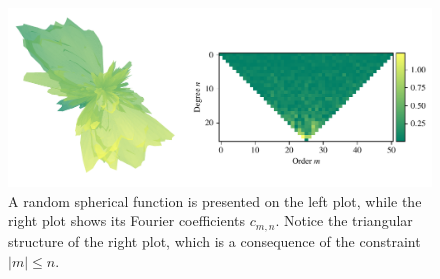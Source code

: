 \begin{figure}
  \centering
  \includegraphics[width=.95\textwidth]{papers/kugel/figures/python/sph-fourier.pdf}
  \caption{
    A random spherical function is presented on the left plot, while the right
    plot shows its Fourier coefficients $c_{m,n}$. Notice the triangular
    structure of the right plot, which is a consequence of the constraint
    $|m|\leq n$.
    \label{kugel:fig:sph-fourier}
  }
\end{figure}

